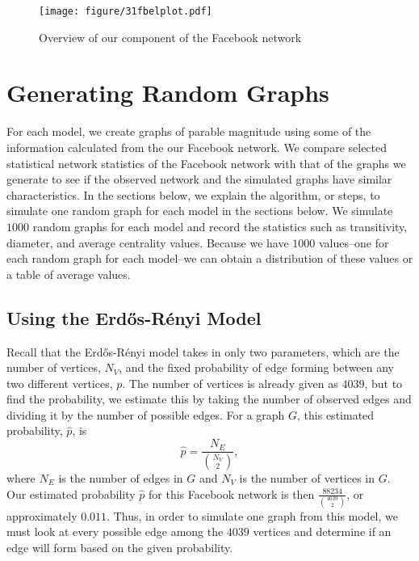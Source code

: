 \documentclass[12pt,twoside]{amherstthesis}
\begin{document}
  \begin{figure}[htbp]
  \centering
  \texttt{[image: figure/31fbelplot.pdf]}
  \caption{Overview of our component of the Facebook network}
  \end{figure}
  
  \section{Generating Random Graphs}\label{generating-random-graphs}
  
  For each model, we create graphs of parable magnitude using some of the
  information calculated from the our Facebook network. We compare
  selected statistical network statistics of the Facebook network with
  that of the graphs we generate to see if the observed network and the
  simulated graphs have similar characteristics. In the sections below, we
  explain the algorithm, or steps, to simulate one random graph for each
  model in the sections below. We simulate \(1000\) random graphs for each
  model and record the statistics such as transitivity, diameter, and
  average centrality values. Because we have \(1000\) values--one for each
  random graph for each model--we can obtain a distribution of these
  values or a table of average values.
  
  \subsection{Using the Erdős-Rényi
  Model}\label{using-the-erdos-renyi-model}
  
  Recall that the Erdős-Rényi model takes in only two parameters, which
  are the number of vertices, \(N_{V}\), and the fixed probability of edge
  forming between any two different vertices, \(p\). The number of
  vertices is already given as \(4039\), but to find the probability, we
  estimate this by taking the number of observed edges and dividing it by
  the number of possible edges. For a graph \(G\), this estimated
  probability, \(\hat{p}\), is
  \[\hat{p} = \frac {N_{E}} {{N_{V} \choose 2}},\] where \(N_{E}\) is the
  number of edges in \(G\) and \(N_{V}\) is the number of vertices in
  \(G\). Our estimated probability \(\hat{p}\) for this Facebook network
  is then \(\frac {88234} {{4039 \choose 2}}\), or approximately
  \(0.011\). Thus, in order to simulate one graph from this model, we must
  look at every possible edge among the \(4039\) vertices and determine if
  an edge will form based on the given probability.
  
\end{document}
